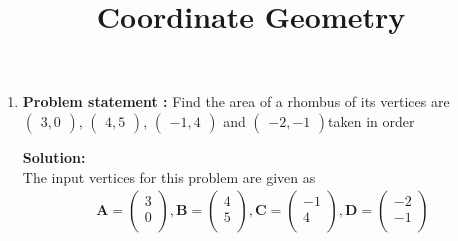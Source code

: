 \documentclass[12pt]{article}
\newcommand{\solution}{\noindent \textbf{Solution: }}
\newcommand{\myvec}[1]{\ensuremath{\begin{pmatrix}#1\end{pmatrix}}}
\let\vec\mathbf
\begin{document}
\begin{center}
\title{\textbf{Coordinate Geometry}}
\date{\vspace{-5ex}} %
\maketitle
\end{center}

\setcounter{page}{1}



\begin{enumerate}

\item\textbf{Problem statement :} Find the area of a rhombus of its vertices are $\myvec{3 ,0}$, $\myvec{4 ,5}$, $\myvec{-1 ,4}$ and $\myvec{-2 ,-1}$taken in order

\solution \\
The input vertices for this problem are given as
	\begin{align}
	\vec{A} = \myvec{
		3\\
		0\\
		},
	\vec{B} = \myvec{
		4\\
		5\\
		},
        \vec{C} = \myvec{
		-1\\
		4\\
		},
        \vec{D} = \myvec{
		-2\\
		-1\\
		}
	\end{align}


\end{enumerate}
\end{document}
